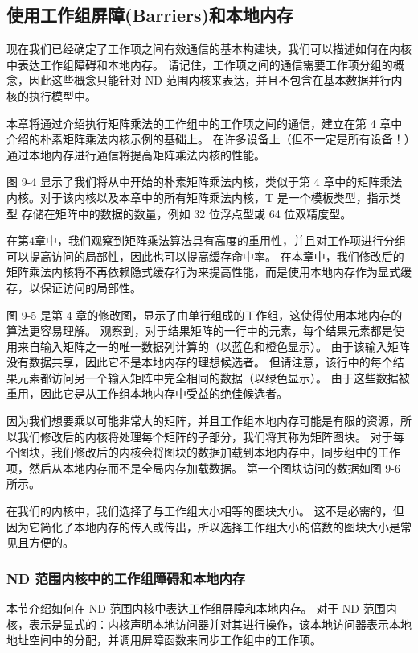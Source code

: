 \subsection{使用工作组屏障(Barriers)和本地内存}
现在我们已经确定了工作项之间有效通信的基本构建块，我们可以描述如何在内核中表达工作组障碍和本地内存。 请记住，工作项之间的通信需要工作项分组的概念，因此这些概念只能针对 ND 范围内核来表达，并且不包含在基本数据并行内核的执行模型中。

本章将通过介绍执行矩阵乘法的工作组中的工作项之间的通信，建立在第 4 章中介绍的朴素矩阵乘法内核示例的基础上。 在许多设备上（但不一定是所有设备！）通过本地内存进行通信将提高矩阵乘法内核的性能。

图 9-4 显示了我们将从中开始的朴素矩阵乘法内核，类似于第 4 章中的矩阵乘法内核。对于该内核以及本章中的所有矩阵乘法内核，T 是一个模板类型，指示类型 存储在矩阵中的数据的数量，例如 32 位浮点型或 64 位双精度型。

在第4章中，我们观察到矩阵乘法算法具有高度的重用性，并且对工作项进行分组可以提高访问的局部性，因此也可以提高缓存命中率。 在本章中，我们修改后的矩阵乘法内核将不再依赖隐式缓存行为来提高性能，而是使用本地内存作为显式缓存，以保证访问的局部性。

图 9-5 是第 4 章的修改图，显示了由单行组成的工作组，这使得使用本地内存的算法更容易理解。 观察到，对于结果矩阵的一行中的元素，每个结果元素都是使用来自输入矩阵之一的唯一数据列计算的（以蓝色和橙色显示）。 由于该输入矩阵没有数据共享，因此它不是本地内存的理想候选者。 但请注意，该行中的每个结果元素都访问另一个输入矩阵中完全相同的数据（以绿色显示）。 由于这些数据被重用，因此它是从工作组本地内存中受益的绝佳候选者。

因为我们想要乘以可能非常大的矩阵，并且工作组本地内存可能是有限的资源，所以我们修改后的内核将处理每个矩阵的子部分，我们将其称为矩阵图块。 对于每个图块，我们修改后的内核会将图块的数据加载到本地内存中，同步组中的工作项，然后从本地内存而不是全局内存加载数据。 第一个图块访问的数据如图 9-6 所示。

在我们的内核中，我们选择了与工作组大小相等的图块大小。 这不是必需的，但因为它简化了本地内存的传入或传出，所以选择工作组大小的倍数的图块大小是常见且方便的。

\subsubsection{ND 范围内核中的工作组障碍和本地内存}
本节介绍如何在 ND 范围内核中表达工作组屏障和本地内存。 对于 ND 范围内核，表示是显式的：内核声明本地访问器并对其进行操作，该本地访问器表示本地地址空间中的分配，并调用屏障函数来同步工作组中的工作项。


